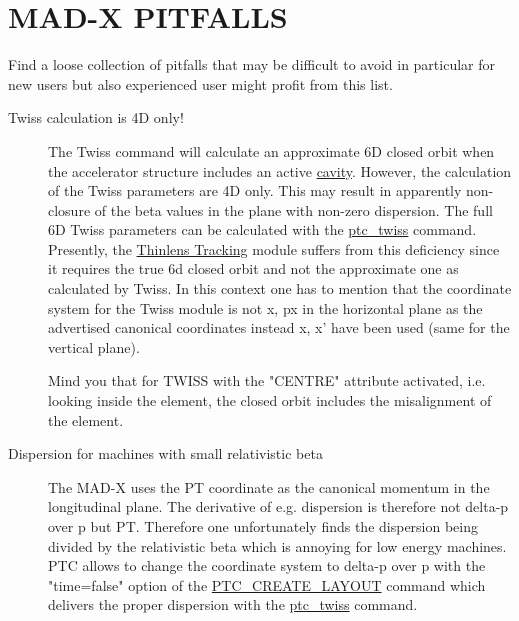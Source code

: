 
\chapter{MAD-X PITFALLS}

Find a loose collection of pitfalls that may be difficult to avoid in
particular for new users but also experienced user might profit from
this list.  


\begin{description}
   \item[Twiss calculation is 4D only!]
   The Twiss command will calculate an approximate 6D closed orbit when
   the accelerator structure includes an active
   \href{../Introduction/cavity.html}{cavity}. However, the calculation
   of the Twiss parameters are 4D only. This may result in apparently
   non-closure of the beta values in the plane with non-zero
   dispersion. The full 6D Twiss parameters can be calculated with the
   \href{../ptc_twiss/ptc_twiss.html}{ptc\_twiss} command. Presently,
   the \href{../thintrack/thintrack.html}{Thinlens Tracking} module
   suffers from this deficiency since it requires the true 6d closed
   orbit and not the approximate one as calculated by Twiss. In this
   context one has to mention that the coordinate system for the Twiss
   module is not x, px in the horizontal plane as the advertised
   canonical coordinates instead x, x' have been used (same for the
   vertical plane).  

   Mind you that for TWISS with the "CENTRE" attribute activated,
   i.e. looking     inside the element, the closed orbit includes the
   misalignment of the element.  



   \item[Dispersion for machines with small relativistic beta] 
   The MAD-X uses the PT coordinate as the canonical momentum in the
   longitudinal plane. The derivative of e.g. dispersion is therefore
   not     delta-p over p but PT. Therefore one unfortunately finds the
   dispersion being divided by the relativistic beta which is annoying
   for low energy machines. PTC allows to change the coordinate system
   to     delta-p over p with the "time=false" option of the
   \href{../ptc_general/ptc_general.html#PTC_CREATE_LAYOUT}{PTC\_CREATE\_LAYOUT}
   command which delivers the proper dispersion with the
   \href{../ptc_twiss/ptc_twiss.html}{ptc\_twiss} command.  




\end{description}
